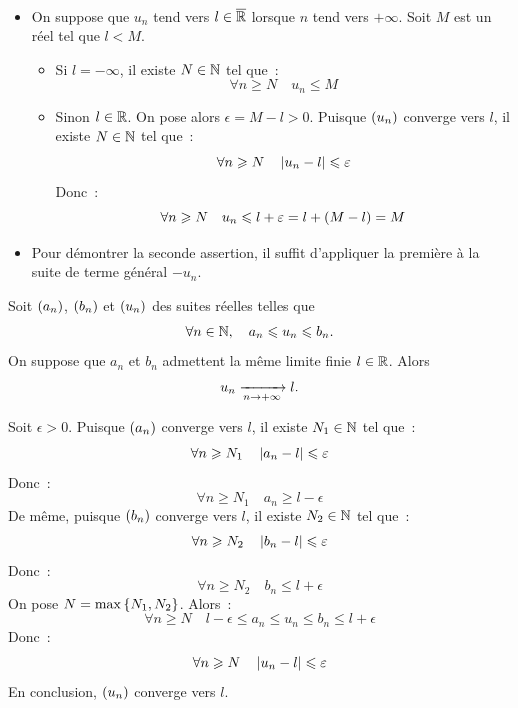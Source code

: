 \documentclass{magnolia}
\begin{document}
\begin{preuve}
$\quad$
\begin{itemize}
\item On suppose que $u_n$ tend vers $l\in\overline{\mathbb{R}}$ lorsque $n$ tend vers
  $+\infty$. Soit $M$ est un réel tel que $l < M$.
  \begin{itemize}
  \item Si $l=-\infty$, il existe $N\in\mathbb{N}$ tel que~:
    \[\forall n\geq N \quad u_n \leq M\]
  \item Sinon $l\in\mathbb{R}$. On pose alors $\epsilon=M-l>0$. Puisque $\left(u_n\right)$
    converge vers $l$, il existe $N\in\mathbb{N}$ tel que~:
    \[\forall n\geqslant N \quad \left|u_n-l\right|\leqslant \varepsilon\]
    Donc~:
    \[\forall n\geqslant N \quad u_n \leqslant l+\varepsilon=l+\left(M-l\right)=M\]
  \end{itemize}
\item Pour démontrer la seconde assertion, il suffit d'appliquer la première
  à la suite de terme général $-u_n$.
\end{itemize}
\end{preuve}


\begin{theoreme}[utile=-3, nom={Théorème des gendarmes}]
Soit $\left(a_n\right)$, $\left(b_n\right)$ et $\left(u_n\right)$ des suites réelles telles que
\[\forall n\in\mathbb{N} ,\quad a_n\leqslant u_n\leqslant b_n.\]
On suppose que $a_n$ et $b_n$ admettent la même limite finie $l\in\mathbb{R}$. Alors
\[u_n\xrightarrow[n\rightarrow +\infty]{} l.\]
\end{theoreme}

\begin{preuve}
Soit $\epsilon>0$. Puisque $\left(a_n\right)$ converge vers $l$, il existe $N_1\in\mathbb{N}$
tel que~:
\[\forall n\geqslant N_1 \quad \left|a_n-l\right|\leqslant \varepsilon\]
Donc~:
\[\forall n\geq N_1 \quad a_n\geq l-\epsilon\]
De même, puisque $\left(b_n\right)$ converge vers $l$, il existe $N_2\in\mathbb{N}$ tel que~:
\[\forall n\geqslant N_2 \quad \left|b_n-l\right|\leqslant \varepsilon\]
Donc~:
\[\forall n\geq N_2 \quad b_n\leq l+\epsilon\]
On pose $N=\max\left\{N_1,N_2\right\}$. Alors~:
\[\forall n\geq N \quad l-\epsilon \leq a_n \leq u_n \leq b_n \leq
  l+\epsilon\]
Donc~:
\[\forall n\geqslant N \quad \left|u_n-l\right|\leqslant\varepsilon\]
En conclusion, $\left(u_n\right)$ converge vers $l$.
\end{preuve}
\end{document}
